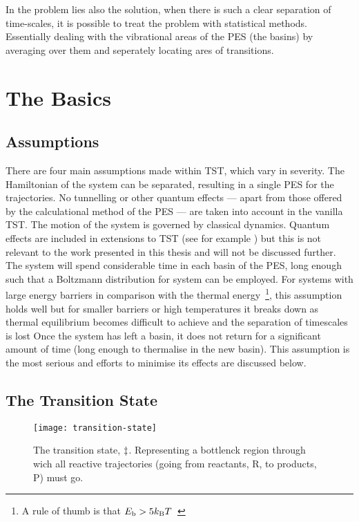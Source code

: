 In the problem lies also the solution, when there is such a clear separation of time-scales, it is possible to treat the problem with statistical methods.
Essentially dealing with the vibrational areas of the PES (the basins) by averaging over them and seperately locating ares of transitions.

\section{The Basics}
\subsection{Assumptions}
There are four main assumptions made within TST, which vary in severity.
The Hamiltonian of the system can be separated, resulting in a single PES for the trajectories.
No tunnelling or other quantum effects --- apart from those offered by the calculational method of the PES --- are taken into account in the vanilla TST.
The motion of the system is governed by classical dynamics.
Quantum effects are included in extensions to TST (see for example \cite{qtst-hj-1997, qtst-hj-1998, qtst-hj-2009}) but this is not relevant to the work presented in this thesis and will not be discussed further.
The system will spend considerable time in each basin of the PES, long enough such that a Boltzmann distribution for system can be employed.
For systems with large energy barriers in comparison with the thermal energy~\footnote{A rule of thumb is that $E_\text{b} > 5k_\text{B} T$~\cite{htst-5ev-2005}}, this assumption holds well but for smaller barriers or high temperatures it breaks down as thermal equilibrium becomes difficult to achieve and the separation of timescales is lost
Once the system has left a basin, it does not return for a significant amount of time (long enough to thermalise in the new basin).
This assumption is the most serious and efforts to minimise its effects are discussed below.

\subsection{The Transition State}

\begin{figure}[h]
\begin{center}
\texttt{[image: transition-state]}
    \parbox{0.85\linewidth}{
\caption{The transition state, $\ddagger$.
Representing a bottlenck region through wich all reactive trajectories (going from reactants, R, to products, P) must go.
}
\label{fig:transition-state}
    }
\end{center}
\end{figure}

